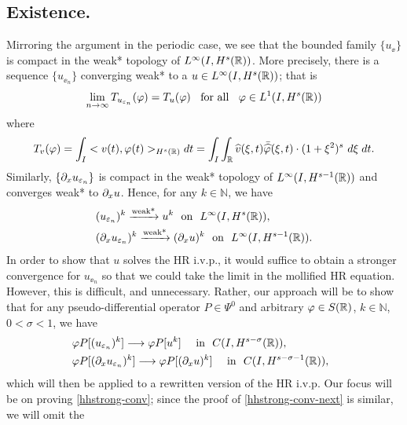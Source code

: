 \subsection{Existence.}
Mirroring the argument in the periodic case, we see that the bounded
family $\{u_\ee\}$ is compact in the weak* topology of $L^\infty(I,
H^{s}(\mathbb{R}))$. More precisely, there is a sequence  $\{ u_{\ee_n} \}$
converging weak* to a $ u\in L^{\infty}(I, H^s(\mathbb{R}))$; that is 
%
\begin{equation*}
\label{hhweak-conv}
\lim_{n\to \infty} T_{u_{\varepsilon_n}}(\varphi)  =  T_u (\varphi) 
\; \;		
\ \text{for all} \  \;\;  \varphi \in L^1(I, H^{s}(\mathbb{R}))
\end{equation*}
where
\begin{equation}
T_v(\varphi) = \int_I <v (t), \varphi (t)>_{H^s(\mathbb{R})} dt  = \int_I
\int_{\mathbb{R}}
\widehat{v}(\xi, t) \bar{\widehat{\varphi}} (\xi, t) \cdot (1 +
\xi^2)^s \ d \xi \; dt.
\end{equation}
%
Similarly, $\left\{ \partial_x u_{\varepsilon_n} \right\}$ is compact in the
weak* topology of $L^\infty(I, H^{s-1}(\mathbb{R}))$ and converges weak*
to $\partial_x u$. Hence, for any $k \in \mathbb{N}$, we have
\begin{align}
\label{base-weak}
& (u_{\varepsilon_n})^k \xrightarrow{\text{weak*}} u^k \ \
\text{on} \ \
L^\infty(I, H^s(\mathbb{R})),
\\
\label{base-weak-2}
& (\partial_x u_{\varepsilon_n})^k \xrightarrow{\text{weak*}} (\partial_x u)^k
\ \ \text{on} \ \
L^\infty(I, H^{s-1}(\mathbb{R})). 
\end{align}
In order to show that $u$ solves the HR i.v.p., it would
suffice to obtain a stronger convergence for  $u_{\ee_n}$ so that 
we could take the limit in the mollified HR equation. However,
this is difficult, and unnecessary. Rather, our approach will be to
show that for any pseudo-differential operator
$P \in \Psi^0$ and arbitrary $\varphi \in S(\mathbb{R})$, $k \in
\mathbb{N}$, $0< \sigma < 1$, we have
%
%
\begin{align}
\label{hhstrong-conv}
& \varphi P [(u_{\ee_n})^k] \longrightarrow \varphi P [u^k]  
\quad
\ \text{in} \  \,\,   C(I, H^{s-\sigma}(\rr)), \ \,
\\
\label{hhstrong-conv-next}
& \varphi P [(\p_x u_{\ee_n})^k] \longrightarrow \varphi P
[(\p_x u)^k]  
\quad
\ \text{in} \  \,\,   C(I, H^{s-\sigma -1}(\rr)), \ \ 
\end{align}
%
which will then be applied to a rewritten version of the HR
i.v.p. Our focus will be on proving \eqref{hhstrong-conv}; since the proof of
\eqref{hhstrong-conv-next} is similar, we will omit the
